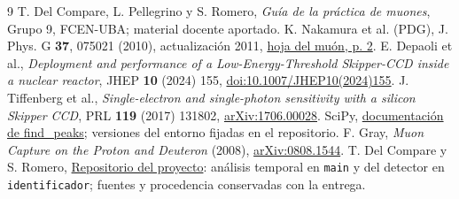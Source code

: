 \documentclass[10pt,a4paper]{article}
\begin{document}
\vspace{1mm}
{\small
\begin{thebibliography}{9}\setlength{\itemsep}{1pt}
 T. Del Compare, L. Pellegrino y S. Romero, \emph{Guía de la práctica de muones}, Grupo 9, FCEN-UBA; material docente aportado.
 K. Nakamura et al. (PDG), J. Phys. G \textbf{37}, 075021 (2010), actualización 2011, \href{https://pdg.lbl.gov/2011/listings/rpp2011-list-muon.pdf}{hoja del muón, p. 2}.
 E. Depaoli et al., \emph{Deployment and performance of a Low-Energy-Threshold Skipper-CCD inside a nuclear reactor}, JHEP \textbf{10} (2024) 155, \href{https://doi.org/10.1007/JHEP10(2024)155}{doi:10.1007/JHEP10(2024)155}.
 J. Tiffenberg et al., \emph{Single-electron and single-photon sensitivity with a silicon Skipper CCD}, PRL \textbf{119} (2017) 131802, \href{https://arxiv.org/abs/1706.00028}{arXiv:1706.00028}.
 SciPy, \href{https://docs.scipy.org/doc/scipy/reference/generated/scipy.signal.find_peaks.html}{documentación de find\_peaks}; versiones del entorno fijadas en el repositorio.
 F. Gray, \emph{Muon Capture on the Proton and Deuteron} (2008), \href{https://arxiv.org/abs/0808.1544}{arXiv:0808.1544}.
 T. Del Compare y S. Romero, \href{https://github.com/santii-romero/Deteccion-de-muones}{Repositorio del proyecto}: análisis temporal en \texttt{main} y del detector en \texttt{identificador}; fuentes y procedencia conservadas con la entrega.
\end{thebibliography}}
\end{document}
